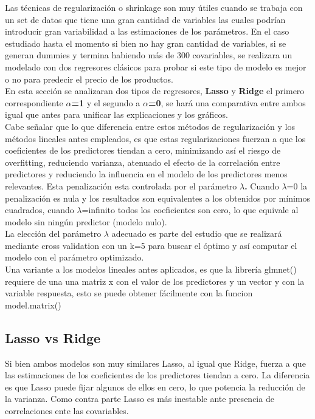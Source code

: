 Las técnicas de regularización o shrinkage son muy útiles cuando se trabaja con un set de datos que tiene una gran cantidad de variables las cuales podrían introducir gran variabilidad a las estimaciones de los parámetros. En el caso estudiado hasta el momento si bien no hay gran cantidad de variables, si se generan dummies y termina habiendo más de 300 covariables, se realizara un modelado con dos regresores clásicos para probar si este tipo de modelo es mejor o no para predecir el precio de los productos.\\
En esta sección se analizaran dos tipos de regresores, \textbf{Lasso} y \textbf{Ridge} el primero correspondiente \textbf{$\alpha$=1} y el segundo a \textbf{$\alpha$=0}, se hará una comparativa entre ambos igual que antes para unificar las explicaciones y los gráficos.\\
Cabe señalar que lo que diferencia entre estos métodos de regularización y los métodos lineales antes empleados, es que estas regularizaciones fuerzan a que los coeficientes de los predictores tiendan a cero, minimizando así el riesgo de overfitting, reduciendo varianza, atenuado el efecto de la correlación entre predictores y reduciendo la influencia en el modelo de los predictores menos relevantes.
Esta penalización esta controlada por el parámetro \textbf{$\lambda$.} Cuando $\lambda$=0 la penalización es nula y los resultados son equivalentes a los obtenidos por mínimos cuadrados, cuando $\lambda$=infinito todos los coeficientes son cero, lo que equivale al modelo sin ningún predictor (modelo nulo).\\
La elección del parámetro $\lambda$ adecuado es parte del estudio que se realizará mediante cross validation con un k=5 para buscar el óptimo y así computar el modelo con el parámetro optimizado.\\
Una variante a los modelos lineales antes aplicados, es que la librería glmnet() \cite{glmnet} requiere de una una matriz x con el valor de los predictores y un vector y con la variable respuesta, esto se puede obtener fácilmente con la funcion model.matrix()



\subsection{Lasso vs Ridge}

Si bien ambos modelos son muy similares Lasso, al igual que Ridge, fuerza a que las estimaciones de los coeficientes de los predictores tiendan a cero. La diferencia es que Lasso puede fijar algunos de ellos en cero, lo que potencia la reducción de la varianza.
Como contra parte Lasso es más inestable ante presencia de correlaciones ente las covariables.


